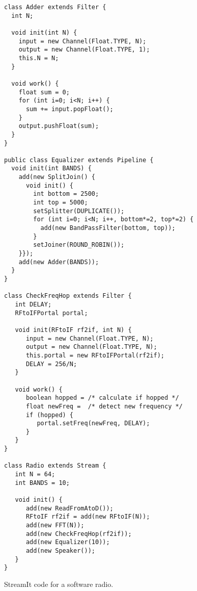 \documentclass{sig-alternate}
\begin{document}
\begin{figure}
\vspace{-6pt}
\caption{Block diagram of a software radio.
\protect\label{fig:radiodiagram}}

\scriptsize
\begin{verbatim}
class Adder extends Filter {
  int N;

  void init(int N) {
    input = new Channel(Float.TYPE, N);
    output = new Channel(Float.TYPE, 1);
    this.N = N;
  }
  
  void work() {
    float sum = 0;
    for (int i=0; i<N; i++) {
      sum += input.popFloat();
    }
    output.pushFloat(sum);
  }
}

public class Equalizer extends Pipeline {
  void init(int BANDS) {
    add(new SplitJoin() {
      void init() {
        int bottom = 2500;
        int top = 5000;
        setSplitter(DUPLICATE());
        for (int i=0; i<N; i++, bottom*=2, top*=2) {
          add(new BandPassFilter(bottom, top));
        }
        setJoiner(ROUND_ROBIN());
    }});
    add(new Adder(BANDS));
  }
}
  
class CheckFreqHop extends Filter {
   int DELAY;
   RFtoIFPortal portal;

   void init(RFtoIF rf2if, int N) {
      input = new Channel(Float.TYPE, N);
      output = new Channel(Float.TYPE, N);
      this.portal = new RFtoIFPortal(rf2if);
      DELAY = 256/N;
   }

   void work() {
      boolean hopped = /* calculate if hopped */
      float newFreq =  /* detect new frequency */
      if (hopped) {
         portal.setFreq(newFreq, DELAY);
      }
   }
}

class Radio extends Stream {
   int N = 64;
   int BANDS = 10;

   void init() {
      add(new ReadFromAtoD());
      RFtoIF rf2if = add(new RFtoIF(N));
      add(new FFT(N));
      add(new CheckFreqHop(rf2if));
      add(new Equalizer(10));
      add(new Speaker());
   }
}
\end{verbatim}
\vspace{-16pt}
\caption{StreamIt code for a software radio.
\protect\label{fig:radiocode}}
\end{figure}


\begin{small}


\end{small}
\end{document}
